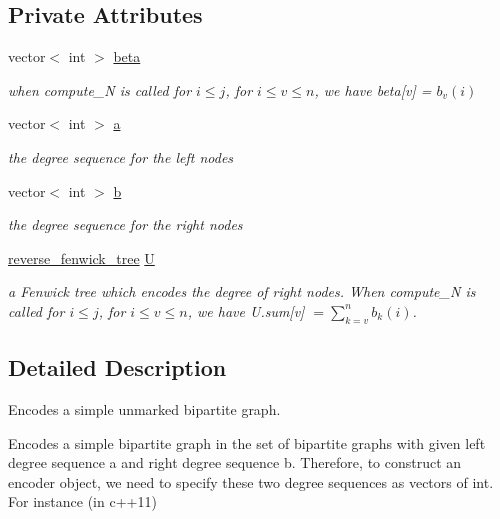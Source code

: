 \subsection*{Private Attributes}
\begin{DoxyCompactItemize}
\item 
vector$<$ int $>$ \hyperlink{classb__graph__encoder_ae54d76cc4cee399d98951f870897a144}{beta}
\begin{DoxyCompactList}\small\item\em when compute\+\_\+N is called for $i \leq j$, for $ i \leq v \leq n$, we have beta\mbox{[}v\mbox{]} = $b_v(i)$ \end{DoxyCompactList}\item 
vector$<$ int $>$ \hyperlink{classb__graph__encoder_afd22d167f495cd85b41397f337c377c2}{a}
\begin{DoxyCompactList}\small\item\em the degree sequence for the left nodes \end{DoxyCompactList}\item 
vector$<$ int $>$ \hyperlink{classb__graph__encoder_a767826e268702e45ab71565e096a52b8}{b}
\begin{DoxyCompactList}\small\item\em the degree sequence for the right nodes \end{DoxyCompactList}\item 
\hyperlink{classreverse__fenwick__tree}{reverse\+\_\+fenwick\+\_\+tree} \hyperlink{classb__graph__encoder_ac810138443002a2b2cf579ced2dc34ce}{U}
\begin{DoxyCompactList}\small\item\em a Fenwick tree which encodes the degree of right nodes. When compute\+\_\+N is called for $i \leq j$, for $i \leq v \leq n$, we have U.\+sum\mbox{[}v\mbox{]} $= \sum_{k = v}^n b_k(i)$. \end{DoxyCompactList}\end{DoxyCompactItemize}


\subsection{Detailed Description}
Encodes a simple unmarked bipartite graph. 

Encodes a simple bipartite graph in the set of bipartite graphs with given left degree sequence a and right degree sequence b. Therefore, to construct an encoder object, we need to specify these two degree sequences as vectors of int. For instance (in c++11)


